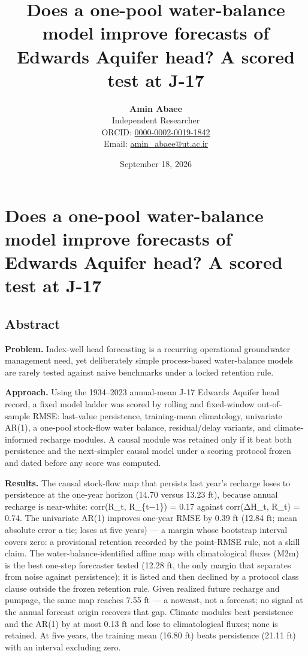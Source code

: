\documentclass[11pt]{article}
\title{Does a one-pool water-balance model improve forecasts of Edwards Aquifer head? A scored test at J-17}
\author{\textbf{Amin Abaee}\\ Independent Researcher\\[2pt] ORCID: \href{https://orcid.org/0000-0002-0019-1842}{0000-0002-0019-1842}\\ Email: \href{mailto:amin_abaee@ut.ac.ir}{amin_abaee@ut.ac.ir}}
\date{September 18, 2026}
\begin{document}
\maketitle

\section{Does a one-pool water-balance model improve forecasts of
Edwards Aquifer head? A scored test at
J-17}\label{does-a-one-pool-water-balance-model-improve-forecasts-of-edwards-aquifer-head-a-scored-test-at-j-17}

\subsection{Abstract}\label{abstract}

\textbf{Problem.} Index-well head forecasting is a recurring operational
groundwater management need, yet deliberately simple process-based
water-balance models are rarely tested against naive benchmarks under a
locked retention rule.

\textbf{Approach.} Using the 1934--2023 annual-mean J-17 Edwards Aquifer
head record, a fixed model ladder was scored by rolling and fixed-window
out-of-sample RMSE: last-value persistence, training-mean climatology,
univariate AR(1), a one-pool stock-flow water balance, residual/delay
variants, and climate-informed recharge modules. A causal module was
retained only if it beat both persistence and the next-simpler causal
model under a scoring protocol frozen and dated before any score was
computed.

\textbf{Results.} The causal stock-flow map that persists last year's
recharge loses to persistence at the one-year horizon (14.70 versus
13.23 ft), because annual recharge is near-white: corr(R\_t, R\_\{t−1\})
= 0.17 against corr(ΔH\_t, R\_t) = 0.74. The univariate AR(1) improves
one-year RMSE by 0.39 ft (12.84 ft; mean absolute error a tie; loses at
five years) --- a margin whose bootstrap interval covers zero: a
provisional retention recorded by the point-RMSE rule, not a skill
claim. The water-balance-identified affine map with climatological
fluxes (M2m) is the best one-step forecaster tested (12.28 ft, the only
margin that separates from noise against persistence); it is listed and
then declined by a protocol class clause outside the frozen retention
rule. Given realized future recharge and pumpage, the same map reaches
7.55 ft --- a nowcast, not a forecast; no signal at the annual forecast
origin recovers that gap. Climate modules beat persistence and the AR(1)
by at most 0.13 ft and lose to climatological fluxes; none is retained.
At five years, the training mean (16.80 ft) beats persistence (21.11 ft)
with an interval excluding zero.
\end{document}

